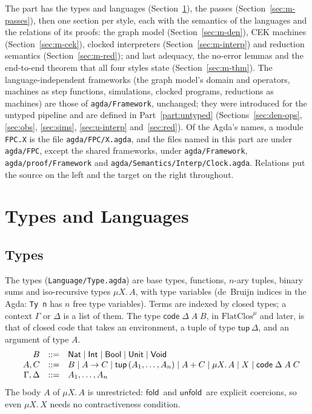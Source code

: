 \documentclass[10pt]{article}
\makeatletter
\theoremstyle{acmplain}
\newcommand{\key}[1]{\mathsf{#1}}
\newcommand{\Ml}[1]{\textrm{#1}^{\mu}}                  %
\newcommand{\Mmu}[2]{\mu #1.\,#2}                         %
\newcommand{\Mtup}[1]{\key{tup}\,#1}                      %
\newcommand{\Mcodety}[3]{\key{code}\;#1\;#2\;#3}          %
\newcommand{\Mfold}{\key{fold}\,}
\newcommand{\Munfold}{\key{unfold}\,}
\newenvironment{syntax}{\[\begin{array}{l@{\quad}rcl}}{\end{array}\]}
\makeatother
\begin{document}
The part has the types and languages (Section~\ref{sec:m-langs}), the
passes (Section~\ref{sec:m-passes}), then one section per style, each
with the semantics of the languages and the relations of its proofs: the
graph model (Section~\ref{sec:m-den}), CEK machines
(Section~\ref{sec:m-cek}), clocked interpreters
(Section~\ref{sec:m-interp}) and reduction semantics
(Section~\ref{sec:m-red}); and last adequacy, the no-error lemmas and
the end-to-end theorem that all four styles state
(Section~\ref{sec:m-thm}). The language-independent frameworks (the
graph model's domain and operators, machines as step functions,
simulations, clocked programs, reductions as machines) are those of
\texttt{agda/Framework}, unchanged; they were introduced for the untyped
pipeline and are defined in Part~\ref{part:untyped}
(Sections~\ref{sec:den-ops}, \ref{sec:obs}, \ref{sec:sims},
\ref{sec:u-interp} and~\ref{sec:red}). Of the Agda's names, a module
\texttt{FPC.X} is the file \texttt{agda/FPC/X.agda}, and the files named
in this part are under \texttt{agda/FPC}, except the shared frameworks,
under \texttt{agda/Framework}, \texttt{agda/proof/Framework} and
\texttt{agda/Semantics/Interp/Clock.agda}. Relations put the source on
the left and the target on the right throughout.

\section{Types and Languages}\label{sec:m-langs}

\subsection{Types}

The types (\texttt{Language/Type.agda}) are base types, functions, $n$-ary
tuples, binary sums and iso-recursive types $\Mmu{X}{A}$, with type
variables (de~Bruijn indices in the Agda: \texttt{Ty n} has $n$ free type
variables). Terms are indexed by closed types; a context $\Gamma$ or
$\Delta$ is a list of them. The type $\Mcodety{\Delta}{A}{B}$, in
$\Ml{FlatClos}$ and later, is that of closed code that takes an environment,
a tuple of type $\Mtup{\Delta}$, and an argument of type $A$.
\begin{syntax}
  & B &::=& \key{Nat} \mid \key{Int} \mid \key{Bool} \mid \key{Unit} \mid \key{Void} \\
  & A, C &::=& B \mid A \rightarrow C \mid \Mtup{(A_1, \ldots, A_n)} \mid A + C
    \mid \Mmu{X}{A} \mid X \mid \Mcodety{\Delta}{A}{C} \\
  & \Gamma, \Delta &::=& A_1, \ldots, A_n
\end{syntax}
The body $A$ of $\Mmu{X}{A}$ is unrestricted: $\Mfold$ and $\Munfold$
are explicit coercions, so even $\Mmu{X}{X}$ needs no contractiveness
condition.
\end{document}
